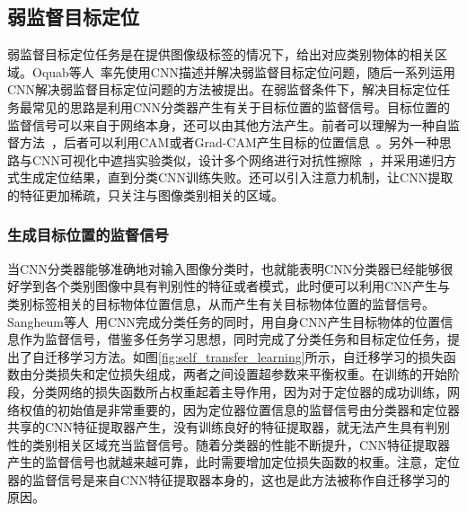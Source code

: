 \subsection{弱监督目标定位}
弱监督目标定位任务是在提供图像级标签的情况下，给出对应类别物体的相关区域。Oquab等人~\cite{Oquab2015IsOL}率先使用CNN描述并解决弱监督目标定位问题，随后一系列运用CNN解决弱监督目标定位问题的方法被提出。在弱监督条件下，解决目标定位任务最常见的思路是利用CNN分类器产生有关于目标位置的监督信号。目标位置的监督信号可以来自于网络本身，还可以由其他方法产生。前者可以理解为一种自监督方法~\cite{2015Hwang}，后者可以利用CAM或者Grad-CAM产生目标的位置信息~\cite{Kim_2017_ICCV, Krishna2018}。另外一种思路与CNN可视化中遮挡实验类似，设计多个网络进行对抗性擦除~\cite{WeiFLCZY17, ZhangWF0H18}，并采用递归方式生成定位结果，直到分类CNN训练失败。还可以引入注意力机制，让CNN提取的特征更加稀疏，只关注与图像类别相关的区域。

\subsubsection*{生成目标位置的监督信号}
当CNN分类器能够准确地对输入图像分类时，也就能表明CNN分类器已经能够很好学到各个类别图像中具有判别性的特征或者模式，此时便可以利用CNN产生与类别标签相关的目标物体位置信息，从而产生有关目标物体位置的监督信号。Sangheum等人~\cite{2015Hwang}用CNN完成分类任务的同时，用自身CNN产生目标物体的位置信息作为监督信号，借鉴多任务学习思想，同时完成了分类任务和目标定位任务，提出了自迁移学习方法。如图\ref{fig:self_transfer_learning}所示，自迁移学习的损失函数由分类损失和定位损失组成，两者之间设置超参数来平衡权重。在训练的开始阶段，分类网络的损失函数所占权重起着主导作用，因为对于定位器的成功训练，网络权值的初始值是非常重要的，因为定位器位置信息的监督信号由分类器和定位器共享的CNN特征提取器产生，没有训练良好的特征提取器，就无法产生具有判别性的类别相关区域充当监督信号。随着分类器的性能不断提升，CNN特征提取器产生的监督信号也就越来越可靠，此时需要增加定位损失函数的权重。注意，定位器的监督信号是来自CNN特征提取器本身的，这也是此方法被称作自迁移学习的原因。

